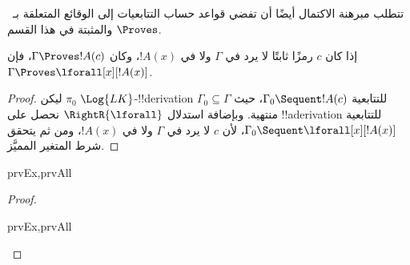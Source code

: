 \documentclass[../../../include/open-logic-section]{subfiles}
\begin{document}

\begin{explain}
  تتطلب مبرهنة الاكتمال أيضًا أن تفضي قواعد حساب التتابعيات إلى
  الوقائع المتعلقة بـ~$\Proves$ والمثبتة في هذا القسم.
\end{explain}

\begin{thm}
 إذا كان $c$ رمزًا ثابتًا لا يرد
في $\Gamma$ ولا في $!A(x)$، وكان $\Gamma \Proves !A(c)$، فإن
$\Gamma \Proves \lforall[x][!A(x)]$.
\end{thm}

\begin{proof}
ليكن $\pi_0$ $\Log{LK}$-!!{derivation} للتتابعية
$\Gamma_0 \Sequent !A(c)$، حيث $\Gamma_0 \subseteq \Gamma$ منتهية.
وبإضافة استدلال $\RightR{\lforall}$ نحصل على !!a{derivation}
للتتابعية $\Gamma_0 \Sequent \lforall[x][!A(x)]$، لأن $c$ لا يرد في
$\Gamma$ ولا في $!A(x)$، ومن ثم يتحقق شرط المتغير المميَّز.
\end{proof}

\begin{prop}
\begin{tagenumerate}{prvEx,prvAll}
\end{tagenumerate}
\end{prop}

\begin{proof}
\begin{tagenumerate}{prvEx,prvAll}
\end{tagenumerate}
\end{proof}
\end{document}
